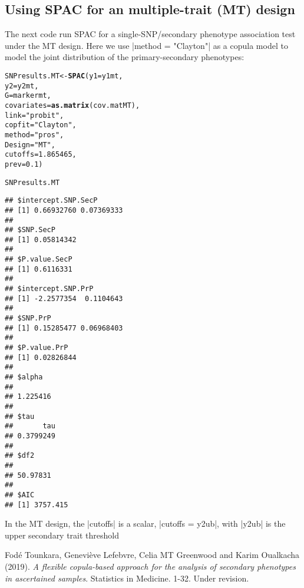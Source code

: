 \documentclass{article}\usepackage[]{graphicx}\usepackage[]{color}
\makeatletter
\newcommand{\hlnum}[1]{\textcolor[rgb]{0.686,0.059,0.569}{#1}}%
\newcommand{\hlstr}[1]{\textcolor[rgb]{0.192,0.494,0.8}{#1}}%
\newcommand{\hlstd}[1]{\textcolor[rgb]{0.345,0.345,0.345}{#1}}%
\newcommand{\hlkwb}[1]{\textcolor[rgb]{0.69,0.353,0.396}{#1}}%
\newcommand{\hlkwc}[1]{\textcolor[rgb]{0.333,0.667,0.333}{#1}}%
\newcommand{\hlkwd}[1]{\textcolor[rgb]{0.737,0.353,0.396}{\textbf{#1}}}%
\newenvironment{kframe}{%
 \def\at@end@of@kframe{}%
 \ifinner\ifhmode%
  \def\at@end@of@kframe{\end{minipage}}%
  \begin{minipage}{\columnwidth}%
 \fi\fi%
 \def\FrameCommand##1{\hskip\@totalleftmargin \hskip-\fboxsep
 \colorbox{shadecolor}{##1}\hskip-\fboxsep
     \hskip-\linewidth \hskip-\@totalleftmargin \hskip\columnwidth}%
 \MakeFramed {\advance\hsize-\width
   \@totalleftmargin\z@ \linewidth\hsize
   \@setminipage}}%
 {\par\unskip\endMakeFramed%
 \at@end@of@kframe}
\newenvironment{knitrout}{}{} %
\makeatother
\begin{document}
\subsection{Using SPAC for an multiple-trait (MT) design}
\label{sec:using-SPAC-MT}
The next code run SPAC for a single-SNP/secondary phenotype association test under the MT design. Here we use |method = "Clayton"| as a copula model to model the joint distribution of the primary-secondary phenotypes:
\begin{knitrout}
\color{fgcolor}\begin{kframe}
\begin{alltt}
\hlstd{SNPresults.MT} \hlkwb{<-} \hlkwd{SPAC}\hlstd{(}\hlkwc{y1} \hlstd{= y1mt,}
                   \hlkwc{y2} \hlstd{= y2mt,}
                   \hlkwc{G} \hlstd{= markermt,}
                   \hlkwc{covariates} \hlstd{=} \hlkwd{as.matrix}\hlstd{(cov.matMT),}
                   \hlkwc{link} \hlstd{=} \hlstr{"probit"}\hlstd{,}
                   \hlkwc{copfit} \hlstd{=} \hlstr{"Clayton"}\hlstd{,}
                   \hlkwc{method} \hlstd{=} \hlstr{"pros"}\hlstd{,}
                   \hlkwc{Design} \hlstd{=} \hlstr{"MT"}\hlstd{,}
                   \hlkwc{cutoffs} \hlstd{=} \hlnum{1.865465}\hlstd{,}
                   \hlkwc{prev} \hlstd{=} \hlnum{0.1}\hlstd{)}
\end{alltt}


{\ttfamily\noindent\itshape\color{messagecolor}{\#\# Starting association analysis of the SNP...}}

{\ttfamily\noindent\color{warningcolor}{\#\# Warning in sqrt(diag(mvar)): NaNs produced}}\begin{alltt}
\hlstd{SNPresults.MT}
\end{alltt}
\begin{verbatim}
## $intercept.SNP.SecP
## [1] 0.66932760 0.07369333
## 
## $SNP.SecP
## [1] 0.05814342
## 
## $P.value.SecP
## [1] 0.6116331
## 
## $intercept.SNP.PrP
## [1] -2.2577354  0.1104643
## 
## $SNP.PrP
## [1] 0.15285477 0.06968403
## 
## $P.value.PrP
## [1] 0.02826844
## 
## $alpha
##          
## 1.225416 
## 
## $tau
##       tau 
## 0.3799249 
## 
## $df2
##          
## 50.97831 
## 
## $AIC
## [1] 3757.415
\end{verbatim}
\end{kframe}
\end{knitrout}

In the MT design, the |cutoffs| is a scalar, |cutoffs = y2ub|, with |y2ub| is the upper secondary trait threshold

\begin{thebibliography}{99}
 Fod\'e Tounkara, Genevi\`eve Lefebvre, Celia MT Greenwood and Karim Oualkacha (2019). \emph{A flexible copula-based approach for the analysis of secondary phenotypes in ascertained samples}. Statistics in Medicine. 1-32. Under revision.
\end{thebibliography}
\end{document}
